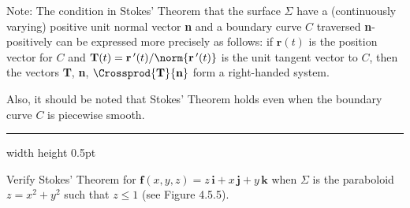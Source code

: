 Note: The condition in Stokes' Theorem that the surface $\Sigma$ have a (continuously varying) positive unit normal
vector \textbf{n} and a boundary curve $C$ traversed \textbf{n}-positively can be expressed more precisely as follows:
if $\textbf{r}(t)$ is the position vector for $C$ and $\textbf{T}(t) = \textbf{r}\,'(t)/\norm{\textbf{r}\,'(t)}$
is the unit tangent vector to $C$, then the vectors \textbf{T}, \textbf{n}, $\Crossprod{\textbf{T}}{\textbf{n}}$ form a
right-handed system.

Also, it should be noted that Stokes' Theorem holds even when the boundary curve $C$ is piecewise smooth.

\vspace{3mm}
\hrule width \textwidth height 0.5pt
\begin{exa}\label{exa:stokesparab}
 Verify Stokes' Theorem for $\textbf{f}(x,y,z) = z\,\textbf{i} + x\,\textbf{j} + y\,\textbf{k}$ when $\Sigma$ is the
 paraboloid $z=x^2 + y^2$ such that $z \le 1$ (see Figure 4.5.5).\vspace{1mm}

\end{exa}
